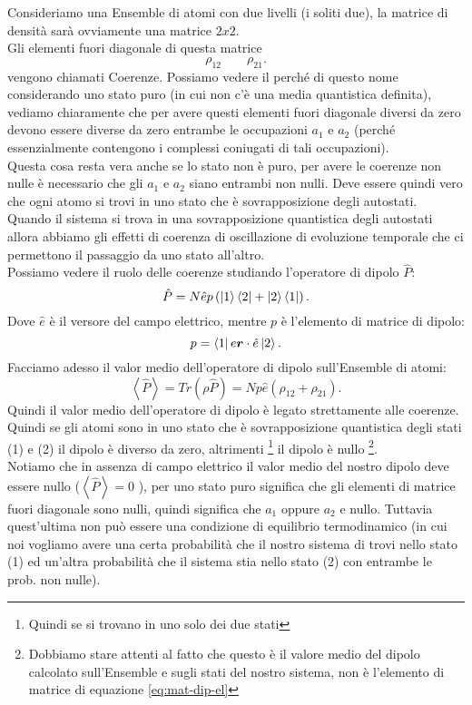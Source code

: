 Consideriamo una Ensemble di atomi con due livelli (i soliti due), la matrice di densità sarà ovviamente una matrice $2x 2$. \\
Gli elementi fuori diagonale di questa matrice
\[
\rho_{12} \quad \quad \rho_{21}
.\]
vengono chiamati Coerenze. Possiamo vedere il perché di questo nome considerando uno stato puro (in cui non c'è una media quantistica definita), vediamo chiaramente che per avere questi elementi fuori diagonale diversi da zero devono essere diverse da zero entrambe le occupazioni $a_1$ e $a_2$ (perché essenzialmente contengono i complessi coniugati di tali occupazioni).\\
Questa cosa resta vera anche se lo stato non è puro, per avere le coerenze non nulle è necessario che gli $a_1$ e $a_2$ siano entrambi non nulli. Deve essere quindi vero che ogni atomo si trovi in uno stato che è sovrapposizione degli autostati. \\
Quando il sistema si trova in una sovrapposizione quantistica degli autostati allora abbiamo gli effetti di coerenza di oscillazione di evoluzione temporale che ci permettono il passaggio da uno stato all'altro. \\
Possiamo vedere il ruolo delle coerenze studiando l'operatore di dipolo $\hat{P}$:
\[
    \hat{P}= N\hat{e}p\left(\ket{1}\bra{2}+ \ket{2}\bra{1}\right)
.\]
Dove $\hat{e}$ è il versore del campo elettrico, mentre $p$ è l'elemento di matrice di dipolo:
\[
    p = \bra{1}e\boldsymbol{r}\cdot \hat{e}\ket{2} \label{eq:mat-dip-el}
.\] 
Facciamo adesso il valor medio dell'operatore di dipolo sull'Ensemble di atomi:
\[
    \left<\hat{P}\right>= Tr\left(\rho\hat{P}\right) =
    Np\hat{e}\left(\rho_{12}+\rho_{21}\right)
.\] 
Quindi il valor medio dell'operatore di dipolo è legato strettamente alle coerenze. Quindi se gli atomi sono in uno stato che è sovrapposizione quantistica degli stati (1) e (2) il dipolo è diverso da zero, altrimenti
\footnote{Quindi se si trovano in uno solo dei due stati} il dipolo è nullo
\footnote{Dobbiamo stare attenti al fatto che questo è il valore medio del dipolo calcolato sull'Ensemble e sugli stati del nostro sistema, non è l'elemento di matrice di equazione \ref{eq:mat-dip-el}}.\\
Notiamo che in assenza di campo elettrico il valor medio del nostro dipolo deve essere nullo ($\left<\hat{P}\right>=0$ ), per uno stato puro significa che gli elementi di matrice fuori diagonale sono nulli, quindi significa che $a_1$  oppure $a_2$  e nullo. Tuttavia quest'ultima non può essere una condizione di equilibrio termodinamico (in cui noi vogliamo avere una certa probabilità che il nostro sistema di trovi nello stato (1) ed un'altra probabilità che il sistema stia nello stato (2) con entrambe le prob. non nulle).\\
